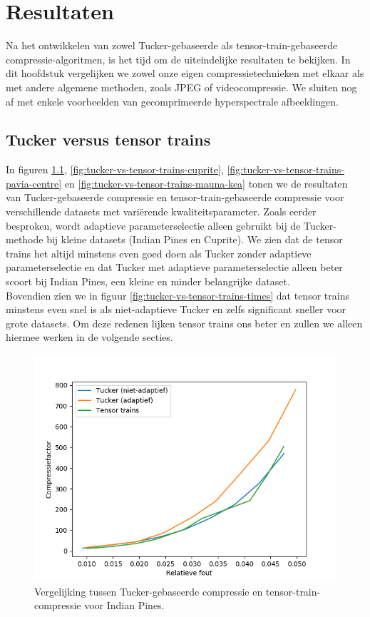 \chapter{Resultaten}
\label{hoofdstuk:resultaten}

Na het ontwikkelen van zowel Tucker-gebaseerde als tensor-train-gebaseerde compressie-algoritmen, is het tijd om de uiteindelijke resultaten te bekijken. In dit hoofdstuk vergelijken we zowel onze eigen compressietechnieken met elkaar als met andere algemene methoden, zoals JPEG of videocompressie. We sluiten nog af met enkele voorbeelden van gecomprimeerde hyperspectrale afbeeldingen.

\section{Tucker versus tensor trains}

In figuren \ref{fig:tucker-vs-tensor-trains-indian-pines}, \ref{fig:tucker-vs-tensor-trains-cuprite}, \ref{fig:tucker-vs-tensor-trains-pavia-centre} en \ref{fig:tucker-vs-tensor-trains-mauna-kea} tonen we de resultaten van Tucker-gebaseerde compressie en tensor-train-gebaseerde compressie voor verschillende datasets met vari\"erende kwaliteitsparameter. Zoals eerder besproken, wordt adaptieve parameterselectie alleen gebruikt bij de Tucker-methode bij kleine datasets (Indian Pines en Cuprite). We zien dat de tensor trains het altijd minstens even goed doen als Tucker zonder adaptieve parameterselectie en dat Tucker met adaptieve parameterselectie alleen beter scoort bij Indian Pines, een kleine en minder belangrijke dataset.\\

Bovendien zien we in figuur \ref{fig:tucker-vs-tensor-trains-times} dat tensor trains minstens even snel is als niet-adaptieve Tucker en zelfs significant sneller voor grote datasets. Om deze redenen lijken tensor trains ons beter en zullen we alleen hiermee werken in de volgende secties.

\begin{figure}[]
  \centering
  \includegraphics[scale=0.7]{images/tucker_vs_tensor_trains_Indian_Pines.png}
  \caption{Vergelijking tussen Tucker-gebaseerde compressie en tensor-train-compressie voor Indian Pines.}
\label{fig:tucker-vs-tensor-trains-indian-pines}
\end{figure}

